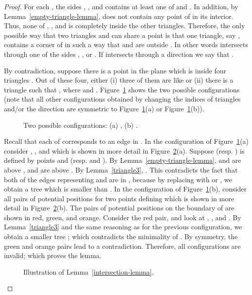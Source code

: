 \documentclass[11pt,a4paper]{article}
\begin{document}
\begin{proof}
For each , the sides , , and  contains at least one of  and . In addition, by Lemma~\ref{empty-triangle-lemma},  does not contain any point of  in its interior. Thus, none of , , and  is completely inside the other triangles. Therefore, the only possible way that two triangles  and  can share a point is that one triangle, say , contains a corner of  in such a way that  and  are outside . In other words  intersects  through one of the sides , , or . If  intersects  through a direction  we say that . 

By contradiction, suppose there is a point  in the plane which is inside four triangles . Out of these four, either (i) three of them are like  or (ii) there is a triangle  such that , where  and . Figure~\ref{configuration-fig} shows the two possible configurations (note that all other configurations obtained by changing the indices of triangles and/or the direction are symmetric to Figure~\ref{configuration-fig}(a) or Figure~\ref{configuration-fig}(b)).
\begin{figure}[htb]
  \centering
\setlength{\tabcolsep}{0in}
  
  \caption{Two possible configurations: (a) , (b) .}
\label{configuration-fig}
\end{figure}

 Recall that each of  corresponds to an edge in . In the configuration of Figure~\ref{configuration-fig}(a) consider , , and  which is shown in more detail in Figure~\ref{matching3-fig}(a). Suppose  (resp. ) is defined by points  and  (resp.  and ). By Lemma~\ref{empty-triangle-lemma},  and  are above ,  and  are above . By Lemma~\ref{triangle3}, . This contradicts the fact that both of the edges representing  and  are in , because by replacing  with  or , we obtain a tree  which is smaller than . In the configuration of Figure~\ref{configuration-fig}(b), consider all pairs of potential positions for two points defining  which is shown in more detail in Figure~\ref{matching3-fig}(b). The pairs of potential positions on the boundary of  are shown in red, green, and orange. Consider the red pair, and look at , , and . By Lemma~\ref{triangle3} and the same reasoning as for the previous configuration, we obtain a smaller tree ;  which contradicts the minimality of . By symmetry, the green and orange pairs lead to a contradiction.
Therefore, all configurations are invalid; which proves the lemma.



\begin{figure}[htb]
  \centering
\setlength{\tabcolsep}{0in}
  
  \caption{Illustration of Lemma~\ref{intersection-lemma}.}
\label{matching3-fig}
\end{figure}
\end{proof}
\end{document}
